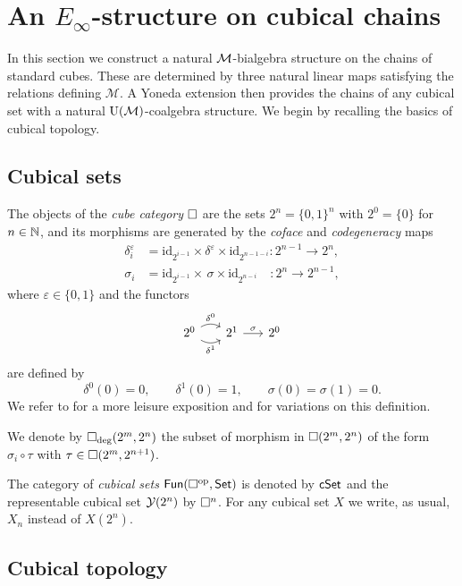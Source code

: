 
\section{An \texorpdfstring{${E_\infty}$}{E-infty}-structure on cubical chains} \label{s:action}

In this section we construct a natural $\mathcal{M}$-bialgebra structure on the chains of standard cubes.
These are determined by three natural linear maps satisfying the relations defining $\mathcal M$.
A Yoneda extension then provides the chains of any cubical set with a natural ${\operatorname{U}(\mathcal{M})}$-coalgebra structure.
We begin by recalling the basics of cubical topology.

\subsection{Cubical sets}

The objects of the \textit{cube category} $\square$ are the sets $2^n = \{0, 1\}^n$ with $2^0 = \{0\}$ for $n \in \mathbb{N}$, and its morphisms are generated by the \textit{coface} and \textit{codegeneracy} maps
\begin{align*}
\delta_i^\varepsilon & = \mathrm{id}_{2^{i-1}} \times \delta^\varepsilon \times \mathrm{id}_{2^{n-1-i}} \colon 2^{n-1} \to 2^n, \\
\sigma_i & = \mathrm{id}_{2^{i-1}} \times \, \sigma \times \mathrm{id}_{2^{n-i}} \quad \colon 2^{n} \to 2^{n-1},
\end{align*}
where $\varepsilon \in \{0,1\}$ and the functors
\[
\begin{tikzcd} [column sep=16pt]
2^0 \arrow[r, bend left, "\delta^0"] \arrow[r, bend right, "\delta^1"'] & 2^1 \arrow[r, "\sigma"] & 2^0
\end{tikzcd}
\]
are defined by
\[
\delta^0(0) = 0, \qquad \delta^1(0) = 1, \qquad \sigma(0) = \sigma(1) = 0.
\]
We refer to \cite{grandis2003cubical} for a more leisure exposition and for variations on this definition.

We denote by $\square_{\deg}(2^m, 2^n)$ the subset of morphism in $\square(2^m, 2^n)$ of the form $\sigma_i \circ \tau$ with $\tau \in \square(2^m, 2^{n+1})$.

The category of \textit{cubical sets} $\mathsf{Fun}(\square^{\mathrm{op}}, \mathsf{Set})$ is denoted by $\mathsf{cSet}$ and the representable cubical set $\operatorname{\mathcal{Y}}(2^n)$ by $\square^n$.
For any cubical set $X$ we write, as usual, $X_n$ instead of $X(2^n)$.

\subsection{Cubical topology}


